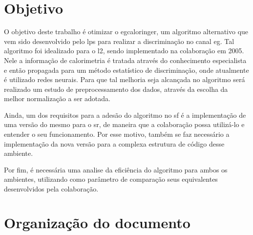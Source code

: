 \section{Objetivo} %

O objetivo deste trabalho é otimizar o \gls{egcaloringer},
um algoritmo alternativo que vem sido desenvolvido pelo \gls{lps}
para realizar a discriminação 
no canal \acrshort{eg}. Tal algoritmo foi idealizado para o \gls{l2}, 
sendo implementado na colaboração em 2005.
Nele a informação de calorimetria é tratada através do conhecimento especialista
e então propagada para um método estatístico 
de discriminação, onde atualmente é utilizado redes neurais. 
Para que tal melhoria seja alcançada no
algoritmo será realizado um estudo de preprocessamento dos dados,
através da escolha da melhor normalização a ser adotada.

Ainda, um dos requisitos para a adesão do algoritmo no \glsdesc{sf} é a
implementação de uma versão do mesmo para o \glsdesc{sr},
de maneira  que a colaboração possa utilizá-lo e entender o seu
funcionamento. Por esse motivo, também se faz necessário a implementação 
da nova versão para a complexa estrutura de código desse ambiente.

Por fim, é necessária uma analise da eficiência do algoritmo para ambos os
ambientes, utilizando como parâmetro de comparação seus equivalentes 
desenvolvidos pela colaboração.

\section{Organização do documento} %



